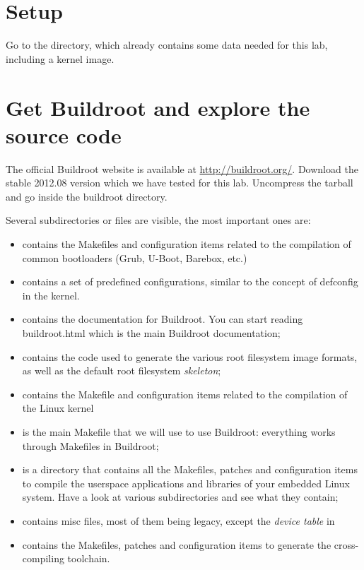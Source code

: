 
\section{Setup}

Go to the  directory,
which already contains some data needed for this lab, including a
kernel image.

\section{Get Buildroot and explore the source code}

The official Buildroot website is available at
\url{http://buildroot.org/}. Download the stable 2012.08 version which
we have tested for this lab. Uncompress the tarball and go inside the
buildroot directory.

Several subdirectories or files are visible, the most important ones
are:

\begin{itemize}
\item {} contains the Makefiles and configuration items
  related to the compilation of common bootloaders (Grub, U-Boot,
  Barebox, etc.)
\item {} contains a set of predefined configurations,
  similar to the concept of defconfig in the kernel.
\item {} contains the documentation for Buildroot. You can
  start reading buildroot.html which is the main Buildroot
  documentation;
\item {} contains the code used to generate the various root
  filesystem image formats, as well as the default root filesystem
  {\em skeleton};
\item {} contains the Makefile and configuration items
  related to the compilation of the Linux kernel
\item {} is the main Makefile that we will use to use
  Buildroot: everything works through Makefiles in Buildroot;
\item {} is a directory that contains all the Makefiles,
  patches and configuration items to compile the userspace
  applications and libraries of your embedded Linux system. Have a
  look at various subdirectories and see what they contain;
\item {} contains misc files, most of them being legacy,
  except the {\em device table} in 
\item {} contains the Makefiles, patches and
  configuration items to generate the cross-compiling toolchain.
\end{itemize}

